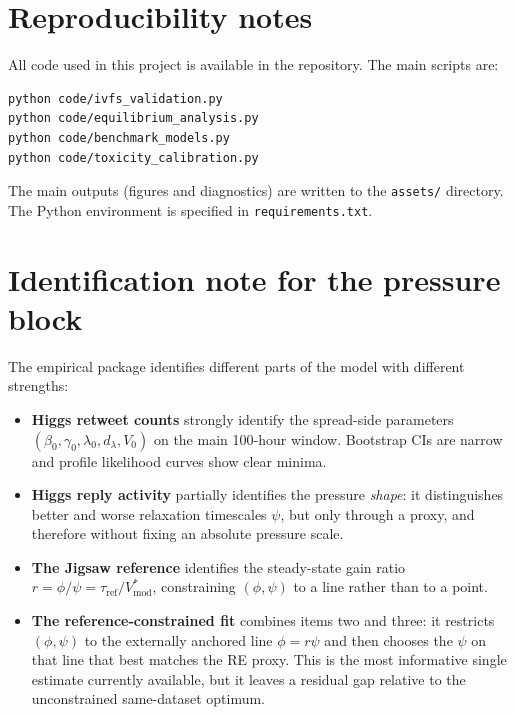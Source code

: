 \documentclass[11pt]{article}
\begin{document}
\appendix

\section{Reproducibility notes}
\label{app:repro}

All code used in this project is available in the repository. The main scripts are:
\begin{verbatim}
python code/ivfs_validation.py
python code/equilibrium_analysis.py
python code/benchmark_models.py
python code/toxicity_calibration.py
\end{verbatim}
The main outputs (figures and diagnostics) are written to the \texttt{assets/} directory. The Python environment is specified in \texttt{requirements.txt}.

\section{Identification note for the pressure block}
\label{app:ident}

The empirical package identifies different parts of the model with different strengths:
\begin{itemize}[leftmargin=1.5em]
    \item \textbf{Higgs retweet counts} strongly identify the spread-side parameters $(\beta_0, \gamma_0, \lambda_0, d_\lambda, V_0)$ on the main 100-hour window. Bootstrap CIs are narrow and profile likelihood curves show clear minima.

    \item \textbf{Higgs reply activity} partially identifies the pressure \emph{shape}: it distinguishes better and worse relaxation timescales $\psi$, but only through a proxy, and therefore without fixing an absolute pressure scale.

    \item \textbf{The Jigsaw reference} identifies the steady-state gain ratio $r = \phi/\psi = \tau_{\mathrm{ref}} / V^*_{\mathrm{mod}}$, constraining $(\phi, \psi)$ to a line rather than to a point.

    \item \textbf{The reference-constrained fit} combines items two and three: it restricts $(\phi, \psi)$ to the externally anchored line $\phi = r\psi$ and then chooses the $\psi$ on that line that best matches the RE proxy. This is the most informative single estimate currently available, but it leaves a residual gap relative to the unconstrained same-dataset optimum.
\end{itemize}
\end{document}
